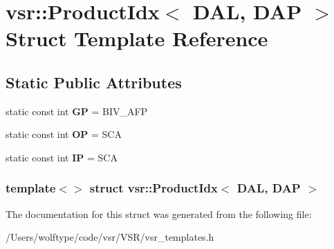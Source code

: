 \hypertarget{structvsr_1_1_product_idx_3_01_d_a_l_00_01_d_a_p_01_4}{\section{vsr\-:\-:Product\-Idx$<$ D\-A\-L, D\-A\-P $>$ Struct Template Reference}
\label{structvsr_1_1_product_idx_3_01_d_a_l_00_01_d_a_p_01_4}
}
\subsection*{Static Public Attributes}
\begin{DoxyCompactItemize}
\item 
\hypertarget{structvsr_1_1_product_idx_3_01_d_a_l_00_01_d_a_p_01_4_a3a60790aa1ccff0c3087080c952f4834}{static const int {\bfseries G\-P} = B\-I\-V\-\_\-\-A\-F\-P}\label{structvsr_1_1_product_idx_3_01_d_a_l_00_01_d_a_p_01_4_a3a60790aa1ccff0c3087080c952f4834}

\item 
\hypertarget{structvsr_1_1_product_idx_3_01_d_a_l_00_01_d_a_p_01_4_a45e13ce2836897d6c4f13e0e09db3e01}{static const int {\bfseries O\-P} = S\-C\-A}\label{structvsr_1_1_product_idx_3_01_d_a_l_00_01_d_a_p_01_4_a45e13ce2836897d6c4f13e0e09db3e01}

\item 
\hypertarget{structvsr_1_1_product_idx_3_01_d_a_l_00_01_d_a_p_01_4_aea80e562e29565e835fd5ae019d31141}{static const int {\bfseries I\-P} = S\-C\-A}\label{structvsr_1_1_product_idx_3_01_d_a_l_00_01_d_a_p_01_4_aea80e562e29565e835fd5ae019d31141}

\end{DoxyCompactItemize}
\subsubsection*{template$<$$>$ struct vsr\-::\-Product\-Idx$<$ D\-A\-L, D\-A\-P $>$}



The documentation for this struct was generated from the following file\-:\begin{DoxyCompactItemize}
\item 
/\-Users/wolftype/code/vsr/\-V\-S\-R/vsr\-\_\-templates.\-h\end{DoxyCompactItemize}
